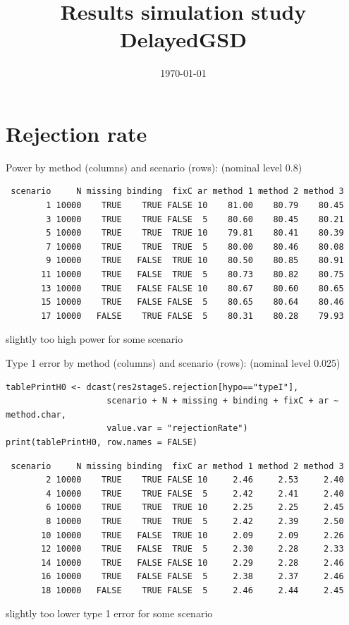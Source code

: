 \documentclass[12pt]{article}
\date{\today}
\title{Results simulation study DelayedGSD}
\newcommand\Warning[1][3ex]{%
\renewcommand\stacktype{L}%
\scaleto{\stackon[1.3pt]{\color{red}$\triangle$}{\tiny\bfseries !}}{#1}%
\xspace
}
\begin{document}
\maketitle

\section{Rejection rate}
\label{sec:org7d4f8cf}

Power by method (columns) and scenario (rows): \hfill (nominal level 0.8)
\begin{verbatim}
 scenario     N missing binding  fixC ar method 1 method 2 method 3
        1 10000    TRUE    TRUE FALSE 10    81.00    80.79    80.45
        3 10000    TRUE    TRUE FALSE  5    80.60    80.45    80.21
        5 10000    TRUE    TRUE  TRUE 10    79.81    80.41    80.39
        7 10000    TRUE    TRUE  TRUE  5    80.00    80.46    80.08
        9 10000    TRUE   FALSE  TRUE 10    80.50    80.85    80.91
       11 10000    TRUE   FALSE  TRUE  5    80.73    80.82    80.75
       13 10000    TRUE   FALSE FALSE 10    80.67    80.60    80.65
       15 10000    TRUE   FALSE FALSE  5    80.65    80.64    80.46
       17 10000   FALSE    TRUE FALSE  5    80.31    80.28    79.93
\end{verbatim}
\Warning slightly too high power for some scenario

\bigskip

Type 1 error by method (columns) and scenario (rows): \hfill (nominal level 0.025)
\lstset{language=r,label= ,caption= ,captionpos=b,numbers=none}
\begin{lstlisting}
tablePrintH0 <- dcast(res2stageS.rejection[hypo=="typeI"],
                    scenario + N + missing + binding + fixC + ar ~ method.char,
                    value.var = "rejectionRate")
print(tablePrintH0, row.names = FALSE)
\end{lstlisting}

\begin{verbatim}
 scenario     N missing binding  fixC ar method 1 method 2 method 3
        2 10000    TRUE    TRUE FALSE 10     2.46     2.53     2.40
        4 10000    TRUE    TRUE FALSE  5     2.42     2.41     2.40
        6 10000    TRUE    TRUE  TRUE 10     2.25     2.25     2.45
        8 10000    TRUE    TRUE  TRUE  5     2.42     2.39     2.50
       10 10000    TRUE   FALSE  TRUE 10     2.09     2.09     2.26
       12 10000    TRUE   FALSE  TRUE  5     2.30     2.28     2.33
       14 10000    TRUE   FALSE FALSE 10     2.29     2.28     2.46
       16 10000    TRUE   FALSE FALSE  5     2.38     2.37     2.46
       18 10000   FALSE    TRUE FALSE  5     2.46     2.44     2.45
\end{verbatim}
\Warning slightly too lower type 1 error for some scenario
\end{document}
